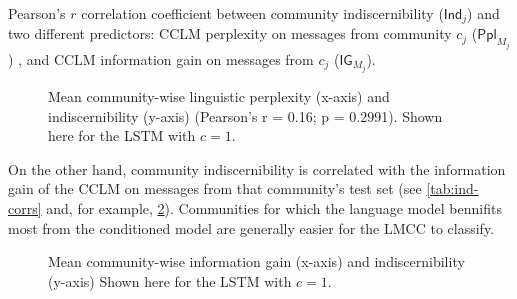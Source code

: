 \documentclass[11pt,a4paper]{article}
\newcommand\Ppl{\mathsf{Ppl}}
\newcommand\IG{\mathsf{IG}}
\newcommand\Ind{\mathsf{Ind}}
\begin{document}
\begin{table}
  \centering
  
  \caption{
    Pearson's $r$ correlation coefficient between community indiscernibility ($\Ind_j$) and
    two different predictors: CCLM perplexity on messages from community $c_j$ ($\Ppl_{M_j}$)
    , and CCLM information gain on messages from $c_j$ ($\IG_{M_j}$).
  }
  \label{tab:ind-corrs}
\end{table}

\begin{figure}
  \caption{%
    Mean community-wise linguistic perplexity (x-axis) 
    and indiscernibility (y-axis) 
    (Pearson's r = \num{0.16}; p = \num{0.2991}).  
    Shown here for the LSTM with $c = 1$.}
  \label{fig:cclm_lmcc_ppl}
\end{figure}


On the other hand, community indiscernibility is correlated with
the information gain of the CCLM 
on messages from that community's test set 
(see \cref{tab:ind-corrs} and, for example, \cref{fig:cclm_lmcc_ppl}).
Communities for which the language model bennifits most from 
the conditioned model are generally easier for the LMCC to classify.

\begin{figure}
  \caption{%
    Mean community-wise information gain (x-axis) 
    and indiscernibility (y-axis) 
    Shown here for the LSTM with $c = 1$.}
  \label{fig:cclm_lmcc_ppl}
\end{figure}



\end{document}
